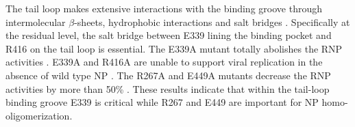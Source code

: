 The tail loop makes extensive interactions with the binding groove through intermolecular $\beta$-sheets, hydrophobic interactions and salt bridges \citep{1140}. Specifically at the residual level, the salt bridge between E339 lining the binding pocket and R416 on the tail loop is essential. The E339A mutant totally abolishes the RNP activities \citep{1232}. E339A and R416A are unable to support viral replication in the absence of wild type NP \citep{1233}. The R267A and E449A mutants decrease the RNP activities by more than 50\% \citep{1232}. These results indicate that within the tail-loop binding groove E339 is critical while R267 and E449 are important for NP homo-oligomerization.
